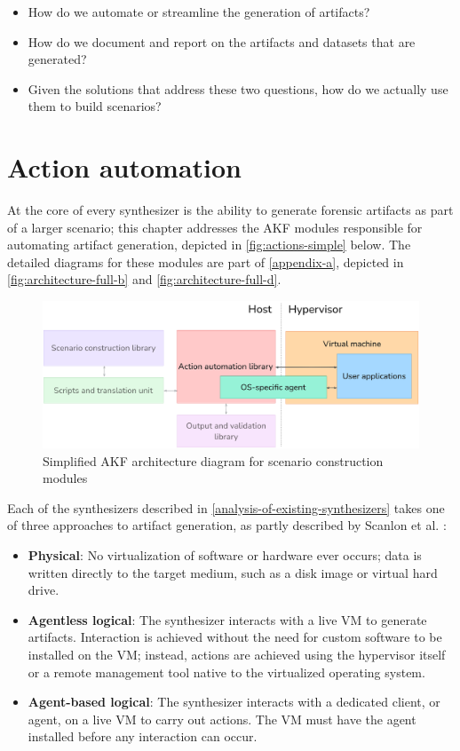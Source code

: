 \documentclass[letterpaper,12pt]{report}
\def\tightlist{}
\begin{document}
\begin{itemize}
\tightlist
\item
  How do we automate or streamline the generation of artifacts?
\item
  How do we document and report on the artifacts and datasets that are
  generated?
\item
  Given the solutions that address these two questions, how do we
  actually use them to build scenarios?
\end{itemize}

\chapter{Action automation}\label{chapter-four}

At the core of every synthesizer is the ability to generate forensic
artifacts as part of a larger scenario; this chapter addresses the AKF
modules responsible for automating artifact generation, depicted in
\autoref{fig:actions-simple} below. The detailed diagrams for these
modules are part of \autoref{appendix-a}, depicted in
\autoref{fig:architecture-full-b} and \autoref{fig:architecture-full-d}.

\begin{figure}[htbp]
\centering
\includegraphics[width=1\linewidth]{actions-simple.png}
\caption{Simplified AKF architecture diagram for scenario construction
modules}\label{fig:actions-simple}
\end{figure}

Each of the synthesizers described in \autoref{analysis-of-existing-synthesizers} takes one of three
approaches to artifact generation, as partly described by Scanlon et al.
\cite{scanlonEviPlantEfficientDigital2017}:

\begin{itemize}
\tightlist
\item
  \textbf{Physical}: No virtualization of software or hardware ever
  occurs; data is written directly to the target medium, such as a disk
  image or virtual hard drive.
\item
  \textbf{Agentless logical}: The synthesizer interacts with a live VM
  to generate artifacts. Interaction is achieved without the need for
  custom software to be installed on the VM; instead, actions are
  achieved using the hypervisor itself or a remote management tool
  native to the virtualized operating system.
\item
  \textbf{Agent-based logical}: The synthesizer interacts with a
  dedicated client, or agent, on a live VM to carry out actions. The VM
  must have the agent installed before any interaction can occur.
\end{itemize}
\end{document}

